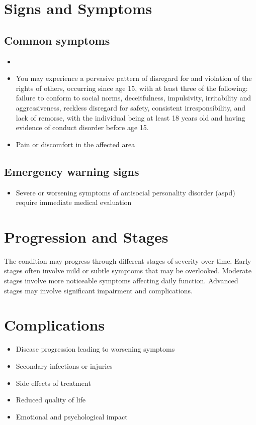 \section{Signs and Symptoms}
\subsection{Common symptoms}
\begin{itemize}[noitemsep]
  \item \item You may experience a pervasive pattern of disregard for and violation of the rights of others, occurring since age 15, with at least three of the following: failure to conform to social norms, deceitfulness, impulsivity, irritability and aggressiveness, reckless disregard for safety, consistent irresponsibility, and lack of remorse, with the individual being at least 18 years old and having evidence of conduct disorder before age 15.
  \item Pain or discomfort in the affected area
  \end{itemize}
\subsection{Emergency warning signs}
\begin{itemize}[noitemsep]
  \item Severe or worsening symptoms of antisocial personality disorder (aspd) require immediate medical evaluation
\end{itemize}
\section{Progression and Stages}
The condition may progress through different stages of severity over time. Early stages often involve mild or subtle symptoms that may be overlooked. Moderate stages involve more noticeable symptoms affecting daily function. Advanced stages may involve significant impairment and complications.
\section{Complications}
\begin{itemize}[noitemsep]
  \item Disease progression leading to worsening symptoms
  \item Secondary infections or injuries
  \item Side effects of treatment
  \item Reduced quality of life
  \item Emotional and psychological impact
\end{itemize}
